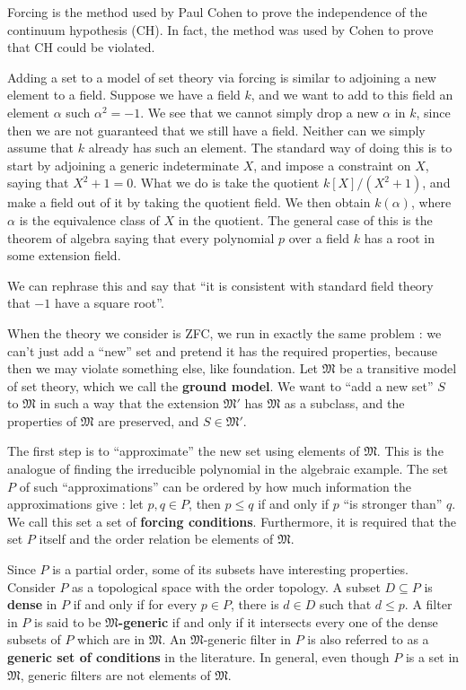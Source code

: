 \documentclass[12pt]{article}
\newcommand{\M}{\mathfrak{M}}
\begin{document}
Forcing is the method used by Paul Cohen to prove the independence of
the continuum hypothesis (CH).  In fact, the method was used by Cohen to
prove that CH could be violated.  

Adding a set to a model of set theory via forcing is similar to adjoining a new element to a field. Suppose we have a field $k$, and we want to add to this field an
element $\alpha$ such $\alpha^2=-1$.  We see
that we cannot simply drop a new $\alpha$ in $k$, since then we are
not guaranteed that we still have a field.  Neither can we simply
assume that $k$ already has such an element.  The standard way of
doing this is to start by adjoining a generic indeterminate $X$, and
impose a constraint on $X$, saying that $X^2+1=0$.  What we do is take
the quotient $k[X]/(X^2+1)$, and make a field out of it by taking the
quotient field.  We then obtain $k(\alpha)$, where $\alpha$ is the
equivalence class of $X$ in the quotient.
The general case of this is the theorem of algebra saying that every
polynomial $p$ over a field $k$ has a root in some extension field.

We can rephrase this and say that ``it is consistent with standard
field theory that $-1$ have a square root''.

When the theory we consider is ZFC, we run in exactly the same
problem : we can't just add a ``new'' set and pretend it has the
required properties, because then we may violate something else, like
foundation.  Let $\M$ be a transitive model of set theory, which we
call the {\bf ground model}.  We want to ``add a new set'' $S$ to $\M$ in
such a way that the extension $\M'$ has $\M$ as a subclass, and the
properties of $\M$ are preserved, and $S\in\M'$.

The first step is to ``approximate'' the new set using elements of
$\M$.  This is the analogue of finding the irreducible polynomial in
the algebraic example.  The set $P$ of such ``approximations'' can be
ordered by how much information the approximations give : let $p,q\in
P$, then $p\leq q$ if and only if $p$ ``is stronger than'' $q$.  We
call this set a set of {\bf forcing conditions}.  Furthermore, it is required that the set $P$ itself and the order relation be elements of $\M$.

Since $P$ is a partial order, some of its subsets have interesting
properties.  Consider $P$ as a topological space with the order
topology.  A subset $D\subseteq P$ is {\bf dense} in $P$ if and only
if for every $p\in P$, there is $d\in D$ such that $d\leq p$.  A
filter in $P$ is said to be {\bf $\M$-generic} if and only if it intersects
every one of the dense subsets of $P$ which are in $\M$.  An $\M$-generic
filter in $P$ is also referred to as a {\bf generic set of conditions}
in the literature.  In general, even though $P$ is a set in $\M$, generic filters are not elements of $\M$.
\end{document}
